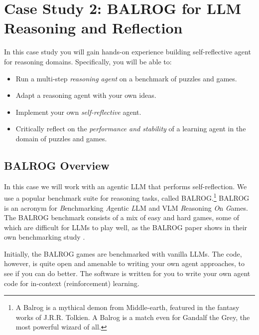 \chapter[Case Study 2: Reasoning and Reflection]{Case Study 2: BALROG for LLM Reasoning and Reflection}\label{chap:balrog}

\begin{learningbox}
In this case study you will gain hands-on experience building self-reflective agent for  reasoning domains. 
Specifically, you will be able to:
\begin{itemize}[leftmargin=*, nosep]
    \item Run a multi-step {\em reasoning agent} on a benchmark of puzzles and games.
    \item Adapt a reasoning agent with your own ideas.
    \item Implement your own {\em self-reflective} agent.
    \item Critically reflect on the {\em performance and stability} of a learning agent in the domain of puzzles and games. 
\end{itemize}
\end{learningbox}

\section{BALROG Overview}
In this case we will work with an agentic LLM that  performs self-reflection. We use a popular benchmark suite for reasoning tasks, called BALROG.\footnote{A Balrog is a mythical demon from Middle-earth, featured in the fantasy works of J.R.R. Tolkien. A Balrog is a match even for Gandalf the Grey, the most powerful wizard of  all.} BALROG is an acronym for {\em B}enchmarking {\em A}gentic {\em L}LM and VLM {\em R}easoning {\em O}n {\em G}ames. The BALROG benchmark consists of a mix of easy and hard games, some of which are difficult for LLMs to play well, as the BALROG paper shows in their own benchmarking study \citep{paglieri2024balrog}. 

Initially, the BALROG games are benchmarked with vanilla LLMs. The code, however, is quite open and amenable to writing your own agent approaches, to see if you can do better.
The software is written for you to write your own agent code for in-context (reinforcement) learning. 



